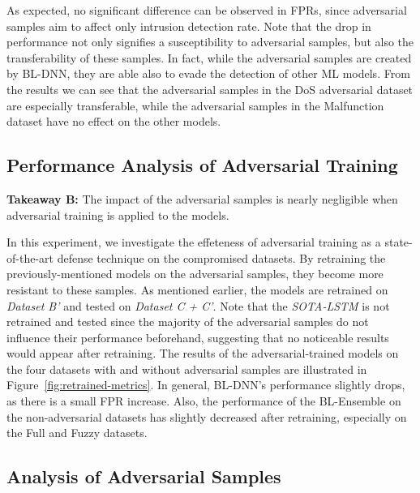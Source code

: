 \documentclass[conference]{IEEEtran}
\begin{document}
As expected, no significant difference can be observed in FPRs, since adversarial samples aim to affect only intrusion detection rate.
%
Note that
%
the drop in performance not only signifies a susceptibility to adversarial samples, but also the transferability of these samples. In fact, while the adversarial samples are created by BL-DNN, they are able also to evade the detection of other ML models. From the results we can see that the adversarial samples in the DoS adversarial dataset are especially transferable, while the adversarial samples in the Malfunction dataset have no effect on the other models.



\subsection{Performance Analysis of Adversarial Training}


\begin{tcolorbox}[colback=gray!30,%
                  colframe=black,%
                  width=\columnwidth,%
                  boxrule=0.5pt,
                  arc=1mm, auto outer arc,
                 ]
\noindent\textbf{Takeaway B:} The impact of the adversarial samples is nearly negligible when adversarial training is applied to the models.

\end{tcolorbox}

%
In this experiment, we investigate the effeteness of adversarial training as a state-of-the-art defense technique on the compromised datasets. By retraining the previously-mentioned models on the adversarial samples, they become more resistant to these samples. As mentioned earlier, the models are retrained on \textit{Dataset B'} and tested on \textit{Dataset C + C'}. Note that the \textit{SOTA-LSTM} is not retrained and tested since the majority of the adversarial samples do not influence their performance beforehand, suggesting that no noticeable results would appear after retraining. The results of the adversarial-trained models on the four datasets with and without adversarial samples are illustrated in Figure~\ref{fig:retrained-metrics}.
In general,  BL-DNN's performance slightly drops, as there is a small FPR increase.
%
Also, the performance of the BL-Ensemble on the non-adversarial datasets has slightly decreased after retraining, especially on the Full and Fuzzy datasets.
%

\subsection{Analysis of Adversarial Samples}
\end{document}
